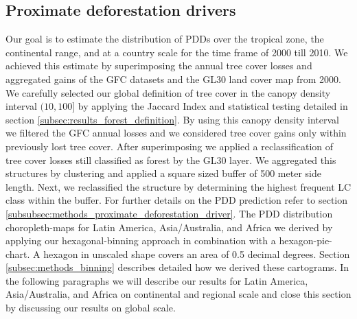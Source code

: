 		\subsection{Proximate deforestation drivers}
		\label{subsec:results_proxy_deforestation_drivers}
			Our goal is to estimate the distribution of \acp{PDD} over the tropical zone, the continental range, and at a country scale for the time frame of 2000 till 2010. We achieved this estimate by superimposing the annual tree cover losses and aggregated gains of the \ac{GFC} datasets and the \ac{GL30} land cover map from 2000. We carefully selected our global definition of tree cover in the canopy density interval $(10,100]$ by applying the Jaccard Index and statistical testing detailed in section \ref{subsec:results_forest_definition}. By using this canopy density interval we filtered the \ac{GFC} annual losses and we considered tree cover gains only within previously lost tree cover. After superimposing we applied a reclassification of tree cover losses still classified as forest by the \ac{GL30} layer. We aggregated this structures by clustering and applied a square sized buffer of 500 meter side length. Next, we reclassified the structure by determining the highest frequent \ac{LC} class within the buffer. For further details on the \ac{PDD} prediction refer to section \ref{subsubsec:methods_proximate_deforestation_driver}. The \ac{PDD} distribution choropleth-maps for Latin America, Asia/Australia, and Africa we derived by applying our hexagonal-binning approach in combination with a hexagon-pie-chart. A hexagon in unscaled shape covers an area of 0.5 decimal degrees. Section \ref{subsec:methods_binning} describes detailed how we derived these cartograms. In the following paragraphs we will describe our results for Latin America, Asia/Australia, and Africa on continental and regional scale and close this section by discussing our results on global scale.

